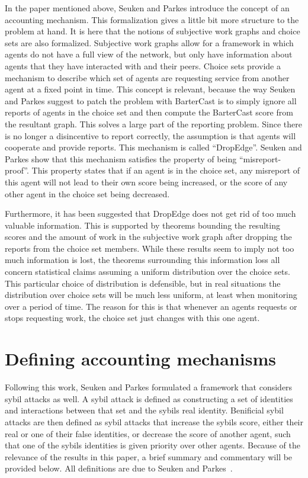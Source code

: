\documentclass[a4paper,11pt]{book}
\theoremstyle{definition}
\begin{document}
In the paper mentioned above, Seuken and Parkes introduce the concept of an accounting mechanism. This formalization gives
a little bit more structure to the problem at hand. It is here that the notions of subjective work graphs
and choice sets are also formalized. Subjective work graphs allow for a framework in which agents
do not have a full view of the network, but only have information about agents that they have interacted
with and their peers. Choice sets provide a mechanism to describe which set of agents are requesting
service from another agent at a fixed point in time. 
This concept is relevant, because the way
Seuken and Parkes suggest to patch the problem with BarterCast is to simply ignore all reports of agents
in the choice set and then compute the BarterCast score from the resultant graph.
This solves a large part of the reporting problem. Since there is no longer a disincentive
to report correctly, the assumption is that agents will cooperate and provide reports.
This mechanism is called ``DropEdge''. Seuken and Parkes show that this mechanism satisfies the property
of being ``misreport-proof''. This property states that if an agent is in the choice set, 
any misreport of this agent will not lead to their own score being increased, or the score of
any other agent in the choice set being decreased.

Furthermore, it has been suggested that DropEdge does not get rid of too much valuable information.
This is supported by theorems bounding the resulting scores and the amount of work in the subjective
work graph after dropping the reports from the choice set members. While these results seem to imply
not too much information is lost, the theorems surrounding this information loss all concern statistical
claims assuming a uniform distribution over the choice sets. This particular choice of distribution is
defensible, but in real situations the distribution over choice sets will be much less uniform, at least
when monitoring over a period of time. The reason for this is that whenever an agents requests or
stops requesting work, the choice set just changes with this one agent.

\section{Defining accounting mechanisms}

Following this work, Seuken and Parkes \cite{seuken2014sybil} formulated a framework that considers sybil attacks as well. 
A sybil attack is defined as constructing a set of identities and interactions between that set and the sybils real identity.
Benificial sybil attacks are then defined as sybil attacks that increase the sybils score, either their real or one of
their false identities, or decrease the score of another  agent, such that one of the sybils identities
is given priority over other agents. Because of the relevance of the results in this paper, a brief summary
and commentary will be provided below. All definitions are due to Seuken and Parkes~\cite{seuken2014sybil}.
\end{document}
